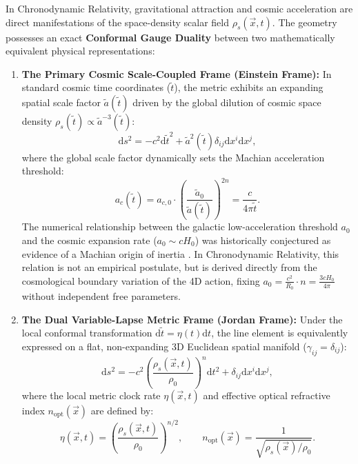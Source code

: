 \documentclass[aps,prd,reprint,superscriptaddress,nofootinbib,floatfix,amsmath,amssymb]{revtex4-2}
\begin{document}
In Chronodynamic Relativity, gravitational attraction and cosmic acceleration are direct manifestations of the space-density scalar field $\rho_s(\vec{x}, t)$. The geometry possesses an exact \textbf{Conformal Gauge Duality} between two mathematically equivalent physical representations:
\begin{enumerate}
    \item \textbf{The Primary Cosmic Scale-Coupled Frame (Einstein Frame):} In standard cosmic time coordinates ($\tilde{t}$), the metric exhibits an expanding spatial scale factor $\tilde{a}(\tilde{t})$ driven by the global dilution of cosmic space density $\rho_s(\tilde{t}) \propto \tilde{a}^{-3}(\tilde{t})$:
    \begin{equation}
    \mathrm{d}s^2 = -c^2 \mathrm{d}\tilde{t}^2 + \tilde{a}^2(\tilde{t}) \delta_{ij} \mathrm{d}x^i \mathrm{d}x^j,
    \label{eq:metric_scale}
    \end{equation}
    where the global scale factor dynamically sets the Machian acceleration threshold:
    \begin{equation}
    a_c(\tilde{t}) = a_{c,0} \cdot \left(\frac{\tilde{a}_0}{\tilde{a}(\tilde{t})}\right)^{2n} = \frac{c}{4\pi \tilde{t}}.
    \label{eq:ac_scale}
    \end{equation}
    The numerical relationship between the galactic low-acceleration threshold $a_0$ and the cosmic expansion rate ($a_0 \sim c H_0$) was historically conjectured as evidence of a Machian origin of inertia \cite{Mach1883,Sciama1953,BransDicke1961,Milgrom1983,Milgrom1999}. In Chronodynamic Relativity, this relation is not an empirical postulate, but is derived directly from the cosmological boundary variation of the 4D action, fixing $a_0 = \frac{c^2}{R_0}\cdot n = \frac{3 c H_0}{4\pi}$ without independent free parameters.
    \item \textbf{The Dual Variable-Lapse Metric Frame (Jordan Frame):} Under the local conformal transformation $\mathrm{d}\tilde{t} = \eta(t)\mathrm{d}t$, the line element is equivalently expressed on a flat, non-expanding 3D Euclidean spatial manifold ($\gamma_{ij} = \delta_{ij}$):
    \begin{equation}
    \mathrm{d}s^2 = -c^2 \left( \frac{\rho_s(\vec{x}, t)}{\rho_0} \right)^n \mathrm{d}t^2 + \delta_{ij} \mathrm{d}x^i \mathrm{d}x^j,
    \label{eq:metric}
    \end{equation}
    where the local metric clock rate $\eta(\vec{x}, t)$ and effective optical refractive index $n_{\text{opt}}(\vec{x})$ are defined by:
    \begin{equation}
    \eta(\vec{x}, t) = \left(\frac{\rho_s(\vec{x}, t)}{\rho_0}\right)^{n/2}, \qquad n_{\text{opt}}(\vec{x}) = \frac{1}{\sqrt{\rho_s(\vec{x}) / \rho_0}}.
    \label{eq:clock_rate}
    \end{equation}
\end{enumerate}
\end{document}

